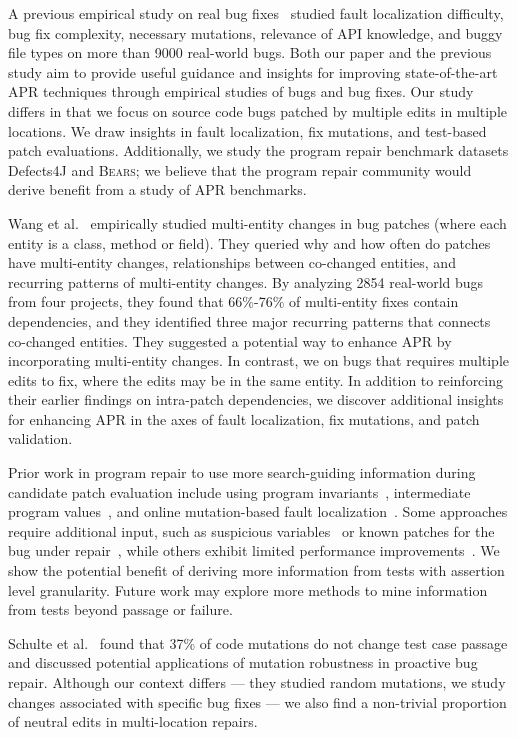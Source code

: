 \documentclass[10pt, conference]{IEEEtran}
\newcommand\bears{\textsc{Bears}\xspace}
\begin{document}
A previous empirical study on real bug fixes~\cite{zhong2015} 
studied fault localization difficulty, bug fix complexity, necessary
mutations, relevance of API knowledge, and buggy file types
on more than 9000 real-world bugs.  
Both our paper and the previous study aim to provide useful guidance and insights for 
improving state-of-the-art APR techniques through empirical studies of bugs and bug fixes. 
Our study differs in that we focus on 
source code bugs patched by multiple edits in multiple locations. 
We draw insights in fault localization, fix mutations, and test-based 
patch evaluations. Additionally, we study the program repair 
benchmark datasets Defects4J 
and \bears; we believe that the program repair community would derive 
benefit from a study of APR benchmarks.

Wang et al.~\cite{wang2018} empirically studied multi-entity changes in bug patches 
(where each entity is a class, method or field). They queried
why and how often do patches have multi-entity changes, relationships 
between co-changed entities, and recurring patterns of multi-entity changes. 
By analyzing 2854 real-world bugs from four projects, they found that 66\%-76\% of
multi-entity fixes contain dependencies, 
and they identified three major recurring patterns that connects co-changed entities. 
They suggested a potential way to 
enhance APR by incorporating multi-entity changes. In contrast, we on bugs that
requires multiple edits to fix, where the edits may be in the same entity. In addition 
to reinforcing their earlier findings on intra-patch dependencies, we discover 
additional insights for enhancing APR in the axes of fault localization, 
fix mutations, and patch validation.

Prior work in program repair to use more search-guiding information 
during candidate patch evaluation 
include using program invariants~\cite{better-fitness, dinglyu}, 
intermediate program values~\cite{source-code-checkpoint}, 
and online mutation-based fault localization~\cite{mut-analysis}.
Some approaches require additional input, such as suspicious variables~\cite{source-code-checkpoint} 
or known patches for the bug under repair~\cite{better-fitness}, 
while others exhibit limited performance improvements~\cite{dinglyu, mut-analysis}.
We show the potential benefit of deriving more information from tests
with assertion level granularity.
Future work may explore more methods to mine information from tests 
beyond passage or failure.

Schulte et al.~\cite{schulte} found that 37\% of code mutations 
do not change test case passage and discussed potential applications 
of mutation robustness in proactive bug repair. 
Although our context differs --- they studied random mutations, 
we study changes associated with specific bug fixes --- we also find a 
non-trivial proportion of neutral edits in multi-location repairs.  
\end{document}
